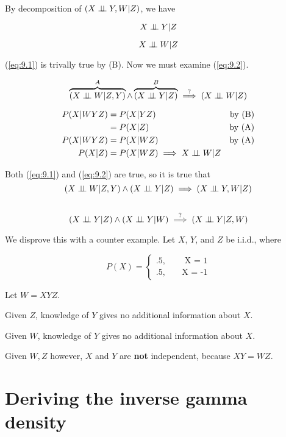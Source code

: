\documentclass{article}
\begin{document}
By decomposition of $(X \perp\!\!\!\perp Y,W | Z)$, we have

\begin{equation} \label{eq:9.1}
  X \perp\!\!\!\perp Y | Z
\end{equation}

\begin{equation} \label{eq:9.2}
  X \perp\!\!\!\perp W | Z
\end{equation}

(\ref{eq:9.1}) is trivally true by (B). Now we must examine
(\ref{eq:9.2}).

\[
\overbrace{(X \ci W | Z,Y)}^{A} \wedge \overbrace{(X \ci Y | Z)}^{B}
\stackrel{?}{\implies} (X \ci W | Z)
\]

\begin{align*}
  P(X|WYZ) &= P(X|YZ) \quad &\text{by (B)} \\
  &= P(X|Z) \quad &\text{by (A)} \\
  P(X|WYZ) &= P(X|WZ) \quad &\text{by (A)} \\
  P(X|Z) &= P(X|WZ) \implies X \perp\!\!\!\perp W | Z
\end{align*}

Both (\ref{eq:9.1}) and (\ref{eq:9.2}) are true, so it is true that
\[
(X \ci W | Z,Y) \wedge (X \ci Y | Z) \implies (X \ci Y,W | Z)
\]

\subsection{}

\[
(X \ci Y | Z) \wedge (X \ci Y | W) \stackrel{?}{\implies} (X \ci Y | Z,W)
\]

We disprove this with a counter example. Let $X$, $Y$, and $Z$ be
i.i.d., where

\[
P(X) =
\begin{cases}
.5, \quad &\text{ X = 1} \\
.5, \quad &\text{X = -1}
\end{cases}
\]

Let $W = XYZ$.

\par
Given $Z$, knowledge of $Y$ gives no additional information about $X$.
\par
Given $W$, knowledge of $Y$ gives no additional information about $X$.
\par
Given $W,Z$ however, $X$ and $Y$ are \textbf{not} independent, because
$XY = WZ$.

\section{Deriving the inverse gamma density}
\end{document}
